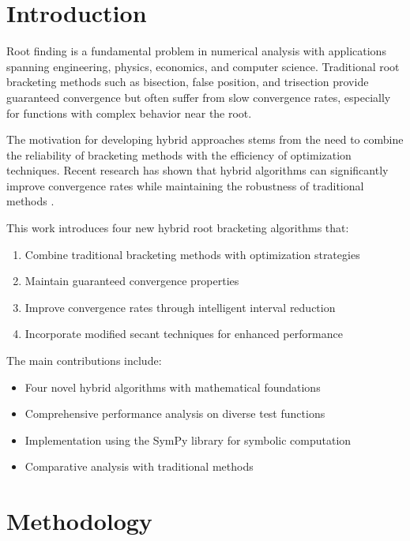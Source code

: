 \documentclass[reprint, amsmath, amssymb, aps, prl]{revtex4-2}
\begin{document}
\maketitle

\section{Introduction}

Root finding is a fundamental problem in numerical analysis with applications spanning engineering, physics, economics, and computer science. Traditional root bracketing methods such as bisection, false position, and trisection provide guaranteed convergence but often suffer from slow convergence rates, especially for functions with complex behavior near the root.

The motivation for developing hybrid approaches stems from the need to combine the reliability of bracketing methods with the efficiency of optimization techniques. Recent research has shown that hybrid algorithms can significantly improve convergence rates while maintaining the robustness of traditional methods \cite{sabharwal2019blended, badr2022novel}.

This work introduces four new hybrid root bracketing algorithms that:

\begin{enumerate}
    \item Combine traditional bracketing methods with optimization strategies
    \item Maintain guaranteed convergence properties
    \item Improve convergence rates through intelligent interval reduction
    \item Incorporate modified secant techniques for enhanced performance
\end{enumerate}

The main contributions include:
\begin{itemize}
    \item Four novel hybrid algorithms with mathematical foundations
    \item Comprehensive performance analysis on diverse test functions
    \item Implementation using the SymPy library for symbolic computation
    \item Comparative analysis with traditional methods
\end{itemize}

\section{Methodology}
\end{document}
